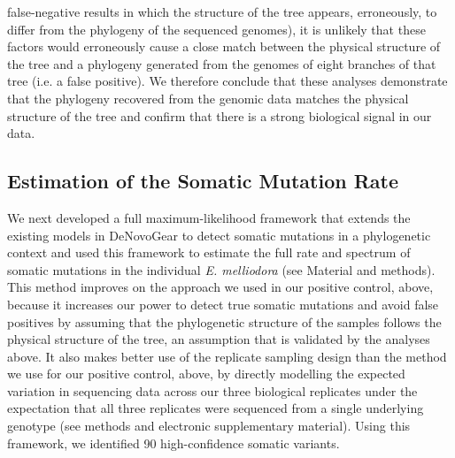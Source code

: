 false-negative results in which the structure of the tree appears, erroneously, to differ from the phylogeny of the sequenced genomes), it is unlikely that these factors would erroneously cause a close match between the physical structure of the tree and a phylogeny generated from the genomes of eight branches of that tree (i.e. a false positive). We therefore conclude that these analyses demonstrate that the phylogeny recovered from the genomic data matches the physical structure of the tree and confirm that there is a strong biological signal in our data.

\subsection{Estimation of the Somatic Mutation Rate}

We next developed a full maximum-likelihood framework that extends the existing models in DeNovoGear \parencite{ramu_denovogear_2013} to detect somatic mutations in a phylogenetic context and used this framework to estimate the full rate and spectrum of somatic mutations in the individual \textit{E. melliodora} (see Material and methods). This method improves on the approach we used in our positive control, above, because it increases our power to detect true somatic mutations and avoid false positives by assuming that the phylogenetic structure of the samples follows the physical structure of the tree, an assumption that is validated by the analyses above. It also makes better use of the replicate sampling design than the method we use for our positive control, above, by directly modelling the expected variation in sequencing data across our three biological replicates under the expectation that all three replicates were sequenced from a single underlying genotype (see methods and electronic supplementary material). Using this framework, we identified 90 high-confidence somatic variants.

